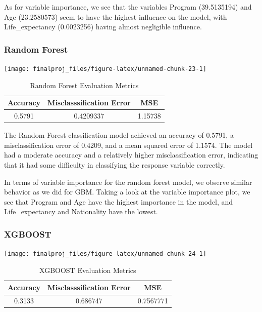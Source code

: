 \documentclass[
]{article}
\begin{document}
As for variable importance, we see that the variables Program
(39.5135194) and Age (23.2580573) seem to have the highest influence on
the model, with Life\_expectancy (0.0023256) having almost negligible
influence.

\hypertarget{random-forest}{%
\subsubsection{Random Forest}\label{random-forest}}

\begin{center}\texttt{[image: finalproj\_files/figure-latex/unnamed-chunk-23-1]} \end{center}

\begin{table}

\caption{\label{tab:unnamed-chunk-23}Random Forest Evaluation Metrics}
\centering
\begin{tabular}[t]{c|c|c}
\hline
Accuracy & Misclasssification Error & MSE\\
\hline
0.5791 & 0.4209337 & 1.15738\\
\hline
\end{tabular}
\end{table}

The Random Forest classification model achieved an accuracy of 0.5791, a
misclassification error of 0.4209, and a mean squared error of 1.1574.
The model had a moderate accuracy and a relatively higher
misclassification error, indicating that it had some difficulty in
classifying the response variable correctly.

In terms of variable importance for the random forest model, we observe
similar behavior as we did for GBM. Taking a look at the variable
importance plot, we see that Program and Age have the highest importance
in the model, and Life\_expectancy and Nationality have the lowest.

\hypertarget{xgboost}{%
\subsubsection{XGBOOST}\label{xgboost}}

\begin{center}\texttt{[image: finalproj\_files/figure-latex/unnamed-chunk-24-1]} \end{center}

\begin{table}

\caption{\label{tab:unnamed-chunk-24}XGBOOST Evaluation Metrics}
\centering
\begin{tabular}[t]{c|c|c}
\hline
Accuracy & Misclasssification Error & MSE\\
\hline
0.3133 & 0.686747 & 0.7567771\\
\hline
\end{tabular}
\end{table}
\end{document}
